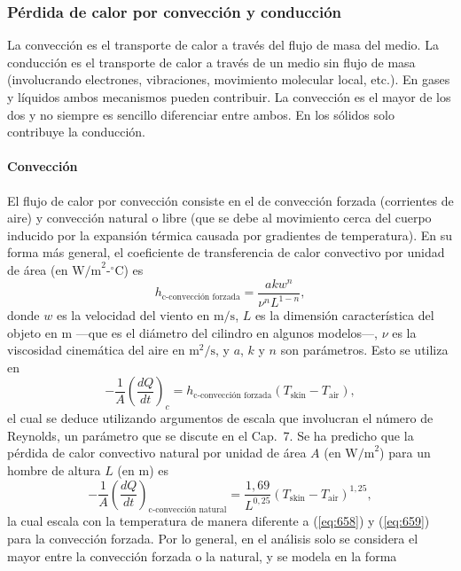 \documentclass[12pt]{book}
\begin{document}
\subsubsection*{Pérdida de calor por convección y conducción}

La convección es el transporte de calor a través del flujo de masa del medio. La conducción es el transporte de calor a través de un medio sin flujo de masa (involucrando electrones, vibraciones, movimiento molecular local, etc.). En gases y líquidos ambos mecanismos pueden contribuir. La convección es el mayor de los dos y no siempre es sencillo diferenciar entre ambos. En los sólidos solo contribuye la conducción.

\paragraph*{Convección}

El flujo de calor por convección consiste en el de convección forzada (corrientes de aire) y convección natural o libre (que se debe al movimiento cerca del cuerpo inducido por la expansión térmica causada por gradientes de temperatura). En su forma más general, el coeficiente de transferencia de calor convectivo por unidad de área (en $\text{W/m}^2\text{-}^\circ\text{C}$) es
\begin{equation}
h_{\text{c-convección forzada}} = \frac{a k w^n}{\nu^n L^{1-n}},
\label{eq:658}
\end{equation}
donde $w$ es la velocidad del viento en $\text{m/s}$, $L$ es la dimensión característica del objeto en $\text{m}$ ---que es el diámetro del cilindro en algunos modelos---, $\nu$ es la viscosidad cinemática del aire en $\text{m}^2\text{/s}$, y $a$, $k$ y $n$ son parámetros. Esto se utiliza en
\begin{equation}
-\frac{1}{A} \left(\frac{dQ}{dt}\right)_c = h_{\text{c-convección forzada}} (T_{\text{skin}} - T_{\text{air}}),
\label{eq:659}
\end{equation}
el cual se deduce \cite{11} utilizando argumentos de escala que involucran el número de Reynolds, un parámetro que se discute en el Cap.~7. Se ha predicho que la pérdida de calor convectivo natural por unidad de área $A$ (en $\text{W/m}^2$) para un hombre de altura $L$ (en $\text{m}$) es
\begin{equation}
-\frac{1}{A} \left(\frac{dQ}{dt}\right)_{\text{c-convección natural}} = \frac{1{,}69}{L^{0{,}25}} (T_{\text{skin}} - T_{\text{air}})^{1{,}25},
\label{eq:660}
\end{equation}
la cual escala con la temperatura de manera diferente a (\ref{eq:658}) y (\ref{eq:659}) para la convección forzada. Por lo general, en el análisis solo se considera el mayor entre la convección forzada o la natural, y se modela en la forma
\end{document}
